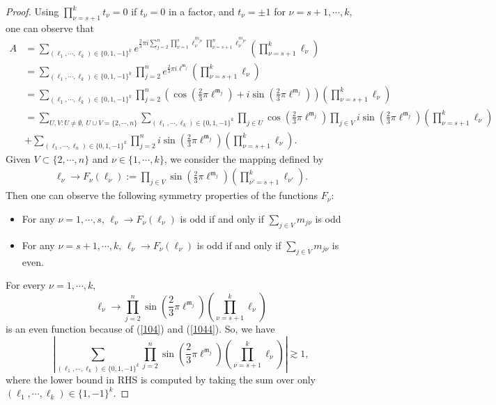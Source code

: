 \documentclass[10pt,a4paper]{amsart}
\numberwithin{equation}{section}
\begin{document}
\begin{proof}
Using $\prod_{\nu=s+1}^k t_{\nu}=0$ if $t_\nu=0$ in a factor, and $t_{\nu}=\pm 1 $ for $\nu=s+1,\cdots,k$, one can observe that
\begin{align*}
A& =  \sum_{(\ell_1,\cdots,\ell_k)\in\{0,1,-1\}^k} e^{\frac{2}{3}\pi i 
 \sum_{j=2}^n \prod_{\nu=1}^s \ell_\nu^{m_{j\nu}} \prod_{\nu=s+1}^n \ell_\nu^{m_{j\nu}}  }\left(\prod_{\nu=s+1}^k \ell_{\nu}\right) \\
& =  \sum_{(\ell_1,\cdots,\ell_k)\in\{0,1,-1\}^k} \prod_{j=2}^n e^{\frac{2}{3}\pi i 
  \ell^{\mathfrak{m}_j}   }\left(\prod_{\nu=s+1}^k \ell_{\nu}\right)\\
& =  \sum_{(\ell_1,\cdots,\ell_k)\in\{0,1,-1\}^k} \prod_{j=2}^n\left( \cos \left(\frac{2}{3}\pi 
  \ell^{\mathfrak{m}_j}\right)+i  \sin \left(\frac{2}{3}\pi 
  \ell^{\mathfrak{m}_j}\right)\right)\left(\prod_{\nu=s+1}^k \ell_{\nu}\right)\\
&=\sum_{U,V: U\ne\emptyset, \ U\cup V=\{2,\cdots,n\}}\sum_{(\ell_1,\cdots,\ell_k)\in\{0,1,-1\}^k}  \prod_{j\in U} \cos \left(\frac{2}{3}\pi 
  \ell^{\mathfrak{m}_j}\right)\prod_{j\in V}i \sin \left(\frac{2}{3}\pi 
  \ell^{\mathfrak{m}_j}\right)\left(\prod_{\nu=s+1}^k \ell_{\nu}\right)\\
  &+\sum_{(\ell_1,\cdots,\ell_n)\in\{0,1,-1\}^k}  \prod_{j=2}^ni \sin \left(\frac{2}{3}\pi 
  \ell^{\mathfrak{m}_j}\right)\left(\prod_{\nu=s+1}^k\ell_{\nu}\right).
\end{align*}
Given $V\subset\{2,\cdots,n\}$ and $\nu\in\{1,\cdots,k\}$,  we consider the mapping defined by
\begin{align}
\ell_\nu\rightarrow F_\nu(\ell_\nu):=\prod_{j\in V} \sin \left(\frac{2}{3}\pi 
  \ell^{\mathfrak{m}_j}\right)\left(\prod_{\nu'=s+1}^k \ell_{\nu'}\right).
\end{align}
Then one can observe the following symmetry properties of the functions $F_\nu$:
\begin{itemize}
\item For any  $\nu=1,\cdots,s$,
$\ell_\nu\rightarrow F_\nu(\ell_\nu)$ is  odd  if and only if $\sum_{j\in V} m_{j\nu}$ is odd
\item For any  $\nu=s+1,\cdots,k$,
$\ell_\nu\rightarrow F_\nu(\ell_\nu)$ is odd if and only  if $\sum_{j\in V}m_{j\nu}$ is even.
\end{itemize}
For every $\nu=1,\cdots,k$,
$$\ell_\nu\rightarrow  \prod_{j=2}^n \sin \left(\frac{2}{3}\pi 
  \ell^{\mathfrak{m}_j}\right)\left(\prod_{\nu=s+1}^k \ell_{\nu}\right)$$ is an even function  because of (\ref{104}) and (\ref{1044}). So,  we have
$$\left|\sum_{(\ell_1,\cdots,\ell_k)\in\{0,1,-1\}^k} \prod_{j=2}^n \sin \left(\frac{2}{3}\pi 
  \ell^{\mathfrak{m}_j}\right)\left(\prod_{\nu=s+1}^k \ell_{\nu}\right)\right|\gtrsim 1,$$
where the lower bound in RHS is computed by taking the sum over only $(\ell_1,\cdots,\ell_k)\in \{1,-1\}^k$.


\end{proof}
\end{document}
